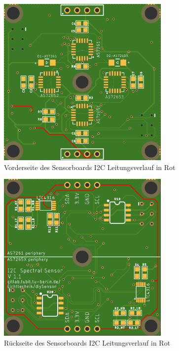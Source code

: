\begin{figure}[H]
\centering
\includegraphics[width=0.75\textwidth]{img/Sensor-platiene_front}
\caption{Vorderseite des Sensorboards I2C Leitungsverlauf in Rot}
\label{fig:Sensor-platiene_front}
\end{figure}

\begin{figure}[H]
\centering
\includegraphics[width=0.75\textwidth]{img/Sensor-platiene_back}
\caption{Rückseite des Sensorboards I2C Leitungsverlauf in Rot}
\label{fig:Sensor-platiene_back}
\end{figure}

